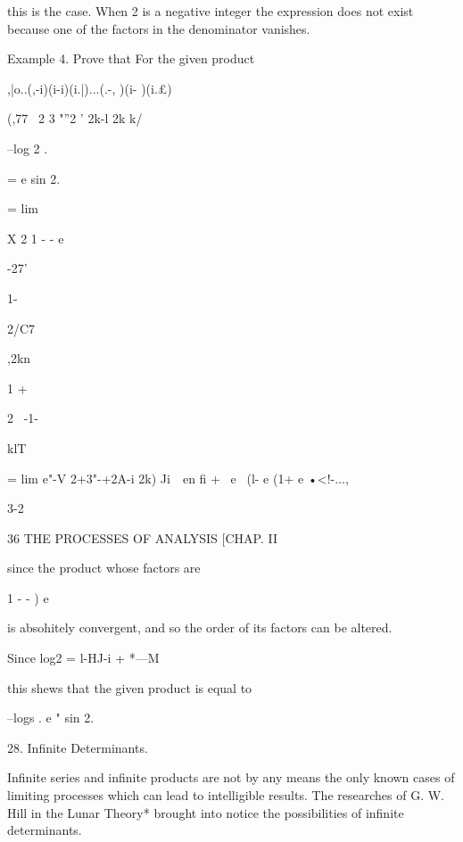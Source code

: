 this is the case. When 2 is a negative integer the expression does not
exist because one of the factors in the denominator vanishes.



Example 4. Prove that For the given product

,|o..(,-i)(i-i)(i.|)...(.-, )(i- )(i.£)

(,77 \ 2 3 "''2 ' 2k-l 2k k/



--log 2 .

= e sin 2.



= lim



X 2 1 - - e



 -27'



1-



2/C7



,2kn



1 +



2 \ -1-



klT



= lim e"-V 2+3"-+2A-i 2k) Ji\ \ en fi + \ e~ (l- e (1+ e •<!-...,



3-2



36 THE PROCESSES OF ANALYSIS [CHAP. II

since the product whose factors are



1 - - ) e



is absohitely convergent, and so the order of its factors can be
altered.

Since log2 = l-HJ-i + *---M

this shews that the given product is equal to



--logs . e " sin 2.



28. Infinite Determinants.

Infinite series and infinite products are not by any means the only
known cases of limiting processes which can lead to intelligible
results. The researches of G. W. Hill in the Lunar Theory* brought
into notice the possibilities of infinite determinants.

